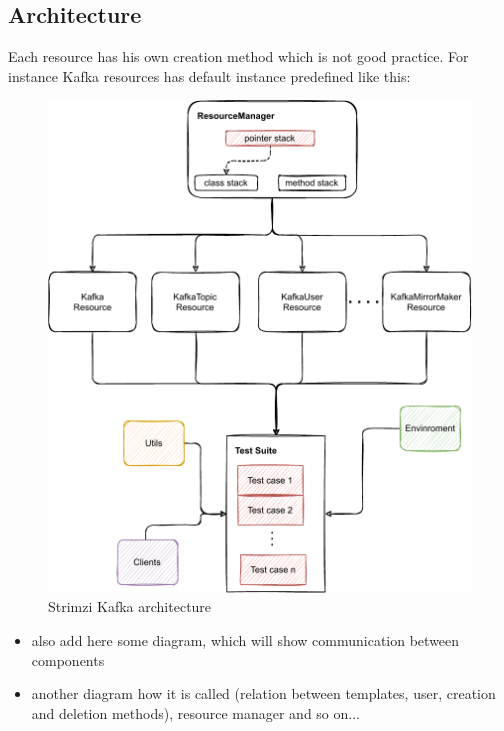 \subsection{Architecture}
\label{02:subsec:strimzisystemtestsarchitecture}

Each resource has his own creation method which is not good practice. For instance Kafka resources has default instance predefined like this:

\begin{figure}[!ht]
    \centering
    \includegraphics[scale=0.70]{obrazky-figures/02-preliminaries/04-strimzi-system-tests/01-architecture-overall.pdf}
    \caption{Strimzi Kafka architecture}
    \label{04:fig:strimzi}
\end{figure}

\begin{itemize}[itemsep=1mm, parsep=0pt]
    \item also add here some diagram, which will show communication between components
    \item another diagram how it is called (relation between templates, user, creation and deletion methods), resource manager and so on...
\end{itemize}

